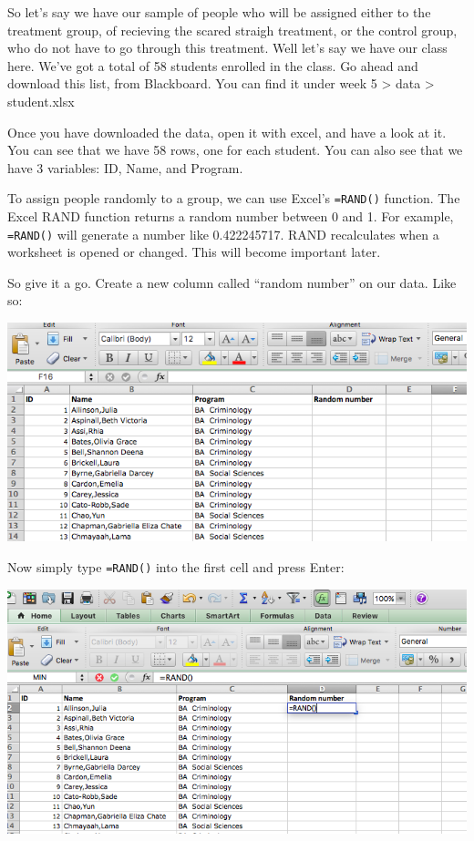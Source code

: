 \documentclass[]{book}
\theoremstyle{definition}
\theoremstyle{definition}
\theoremstyle{definition}
\theoremstyle{remark}
\begin{document}
 So let's say we have our sample of people who will be assigned either
to the treatment group, of recieving the scared straigh treatment, or
the control group, who do not have to go through this treatment. Well
let's say we have our class here. We've got a total of 58 students
enrolled in the class. Go ahead and download this list, from Blackboard.
You can find it under week 5 \textgreater{} data \textgreater{}
student.xlsx

Once you have downloaded the data, open it with excel, and have a look
at it. You can see that we have 58 rows, one for each student. You can
also see that we have 3 variables: ID, Name, and Program.

To assign people randomly to a group, we can use Excel's
\texttt{=RAND()} function. The Excel RAND function returns a random
number between 0 and 1. For example, \texttt{=RAND()} will generate a
number like 0.422245717. RAND recalculates when a worksheet is opened or
changed. This will become important later.

So give it a go. Create a new column called ``random number'' on our
data. Like so:

\includegraphics{imgs/rand_col.png}

Now simply type \texttt{=RAND()} into the first cell and press Enter:

\includegraphics{imgs/type_rand.png}
\end{document}
